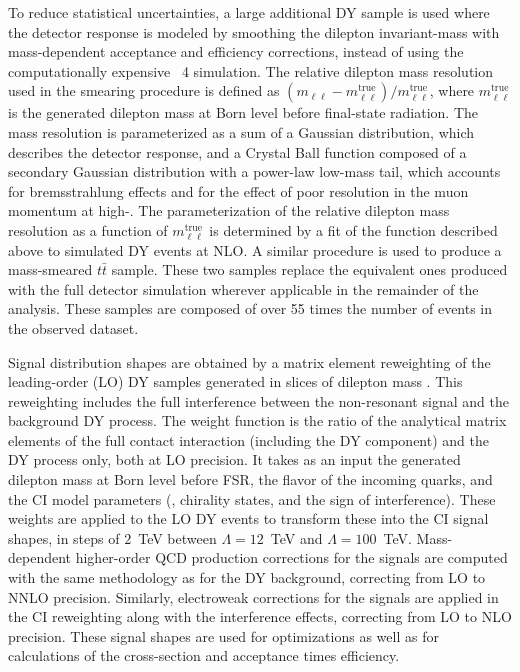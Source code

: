 To reduce statistical uncertainties, a large additional DY sample is used where the detector response is modeled by smoothing the dilepton invariant-mass with mass-dependent acceptance and efficiency corrections, instead of using the computationally expensive \GEANT~4 simulation.
The relative dilepton mass resolution used in the smearing procedure is defined as $(m_{\ell\ell}-m_{\ell\ell}^\mathrm{true})/m_{\ell\ell}^\mathrm{true}$, where $m_{\ell\ell}^\mathrm{true}$ is the generated dilepton mass at Born level before final-state radiation.
The mass resolution is parameterized as a sum of a Gaussian distribution, which describes the detector response, and a Crystal Ball function composed of a secondary Gaussian distribution with a power-law low-mass tail, which accounts for bremsstrahlung effects and for the effect of poor resolution in the muon momentum at high-\pt.
The parameterization of the relative dilepton mass resolution as a function of $m_{\ell\ell}^\mathrm{true}$ is determined by a fit of the function described above to simulated DY events at NLO.
A similar procedure is used to produce a mass-smeared $t\bar{t}$ sample.
These two samples replace the equivalent ones produced with the full detector simulation wherever applicable in the remainder of the analysis.
These samples are composed of over 55 times the number of events in the observed dataset.

Signal \mll distribution shapes are obtained by a matrix element reweighting of the leading-order (LO) DY samples generated in slices of dilepton mass \cite{EXOT-2016-05}.
This reweighting includes the full interference between the non-resonant signal and the background DY process.
The weight function is the ratio of the analytical matrix elements of the full contact interaction (including the DY component) and the DY process only, both at LO precision.
It takes as an input the generated dilepton mass at Born level before FSR, the flavor of the incoming quarks, and the CI model parameters (\lam, chirality states, and the sign of interference).
These weights are applied to the LO DY events to transform these into the CI signal shapes, in steps of $2$~TeV between $\Lambda=12$~TeV and $\Lambda=100$~TeV.
Mass-dependent higher-order QCD production corrections for the signals are computed with the same methodology as for the DY background, correcting from LO to NNLO precision.
Similarly, electroweak corrections for the signals are applied in the CI reweighting along with the interference effects, correcting from LO to NLO precision.
These signal shapes are used for optimizations as well as for calculations of the cross-section and acceptance times efficiency.

